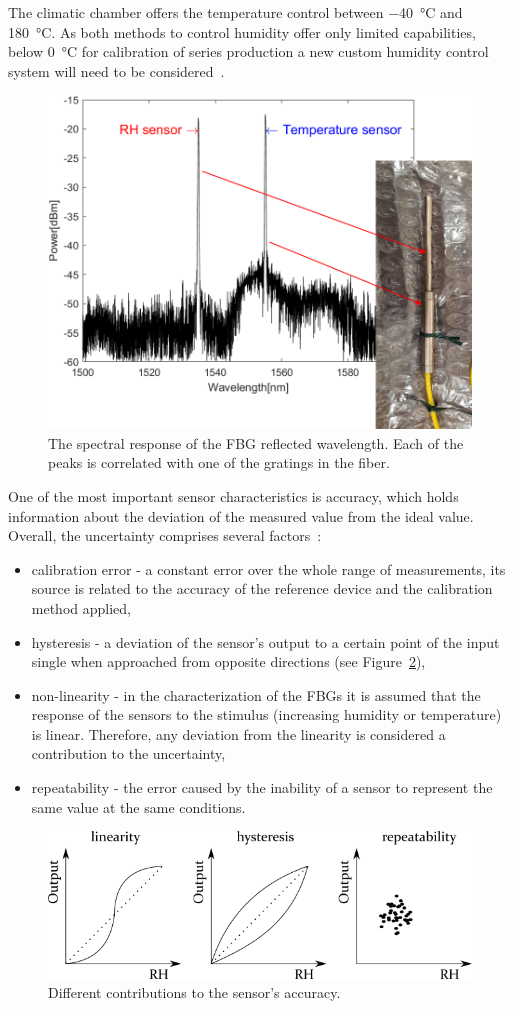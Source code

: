 The climatic chamber offers the temperature control between \SI{-40}{\celsius} and \SI{180}{\celsius}. As both methods to control humidity offer only limited capabilities, below \SI{0}{\celsius} for calibration of series production a new custom humidity control system will need to be considered~\cite{Berruti, Veldscholte:2021wjt}.
\begin{figure}[!h]
\centering
\includegraphics[width=0.6\columnwidth]{Chapter5/images/hygr.png}
\caption{The spectral response of the FBG reflected wavelength. Each of the peaks is correlated with one of the gratings in the fiber.}
\label{fig_hygrometer1}
\end{figure}
\newpage
One of the most important sensor characteristics is accuracy, which holds information about the deviation of the measured value from the ideal value. Overall, the uncertainty comprises several factors~\cite{sensors_physics}:
\begin{itemize}
    \item calibration error - a constant error over the whole range of measurements, its source is related to the accuracy of the reference device and the calibration method applied,
    \item hysteresis - a deviation of the sensor's output to a certain point of the input single when approached from opposite directions (see Figure~\ref{fig:accuracy}), 
    \item non-linearity - in the characterization of the \glspl{FBG} it is assumed that the response of the sensors to the stimulus (increasing humidity or temperature) is linear. Therefore, any deviation from the linearity is considered a contribution to the uncertainty,
    \item repeatability - the error caused by the inability of a sensor to represent the same value at the same conditions. 
\end{itemize}
\begin{figure}[!h]
\centering
\includegraphics[width=0.85\columnwidth]{Chapter5/images/Picture2.png}
\caption{Different contributions to the sensor's accuracy.}
\label{fig:accuracy}
\end{figure}
